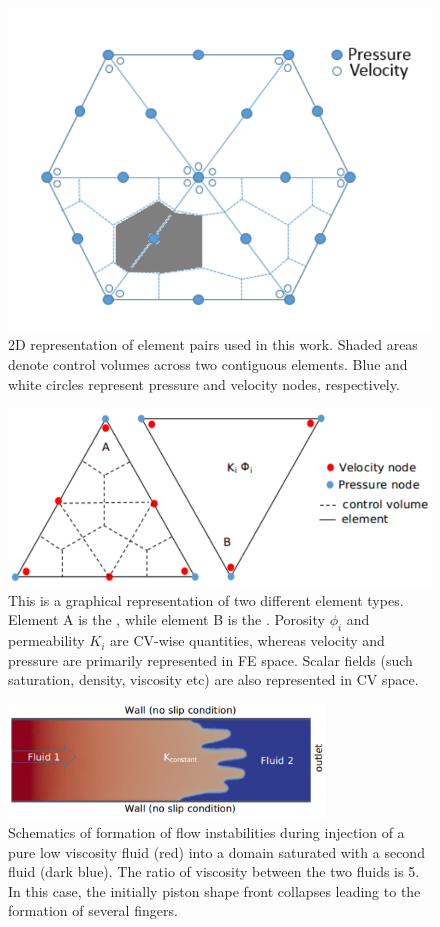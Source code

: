 
\begin{figure}[h]
\centering
\vbox{\includegraphics[width=.5\textwidth]{./Pics/P1DGP2.pdf}}
\caption{2D representation of  element pairs used in this work. Shaded areas denote control volumes across two contiguous elements. Blue and white circles represent pressure and velocity nodes, respectively.}
\label{fig:fem_cv}
\end{figure}

\clearpage

\begin{figure}[h]
\centering
\vbox{\includegraphics[width=.75\textwidth]{./Pics/element_n.pdf}}
\caption{This is a graphical representation of two different element types. Element A is the , while element B is the . Porosity $\phi_{i}$ and permeability $K_{i}$ are CV-wise quantities, whereas velocity and pressure are primarily represented in FE space. Scalar fields (such saturation, density, viscosity etc) are also represented in CV space.}
\label{fig:fem_elem}
\end{figure}
\clearpage

\begin{figure}[h]
\centering
\vbox{\includegraphics[width=0.75\textwidth]{./Pics/phase_vol_frac_uni_perm_1.pdf}}
\caption{Schematics of formation of flow instabilities during injection of a pure low viscosity fluid (red) into a domain saturated with a second fluid (dark blue). The ratio of viscosity between the two fluids is 5. In this case, the initially piston shape front collapses leading to the formation of several fingers.}
\label{fig:simple_case}
\end{figure}
\clearpage


